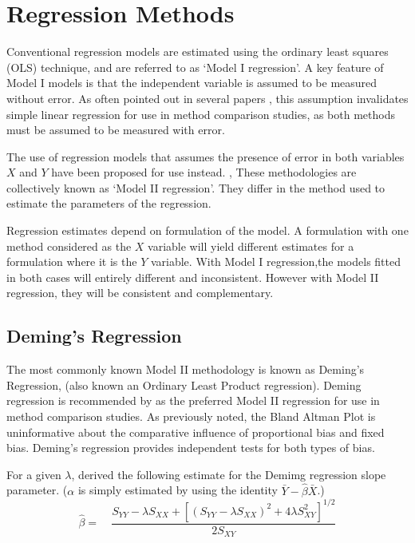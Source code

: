 \documentclass[MAIN.tex]{subfiles}
\begin{document}
	
		\section{Regression Methods}
	Conventional regression models are estimated using the ordinary
	least squares (OLS) technique, and are referred to as `Model I
	regression'\citep{CornCoch,ludbrook97}. A key feature of Model I
	models is that the independent variable is assumed to be measured
	without error. As often pointed out in several papers
	\citep{BA83,ludbrook97}, this assumption invalidates simple linear
	regression for use in method comparison studies, as both methods
	must be assumed to be measured with error.
	
	The use of regression models that assumes the presence of error in
	both variables $X$ and $Y$ have been proposed for use instead.
	\citep{CornCoch,ludbrook97}, These methodologies are collectively
	known as `Model II regression'. They differ in the method used to
	estimate the parameters of the regression.
	
	Regression estimates depend on formulation of the model. A
	formulation with one method considered as the $X$ variable will
	yield different estimates for a formulation where it is the $Y$
	variable. With Model I regression,the models fitted in both cases
	will entirely different and inconsistent. However with Model II
	regression, they will be consistent and complementary.
	
	\subsection{Deming's Regression}
	The most commonly known Model II methodology is known as Deming's
	Regression, (also known an Ordinary Least Product regression).
	Deming regression is recommended by \citet*{CornCoch} as the
	preferred Model II regression for use in method comparison
	studies. As previously noted, the Bland Altman Plot is
	uninformative about the comparative influence of proportional bias
	and fixed bias. Deming's regression provides independent tests for
	both types of bias.
	
	For a given $\lambda$, \citet{Kummel} derived the following
	estimate for the Demimg regression slope parameter. ($\alpha$ is
	simply estimated by using the identity
	$\bar{Y}-\hat{\beta}\bar{X}$.)
	\begin{equation}
	\hat{\beta} =\quad \frac{S_{YY} - \lambda S_{XX}+[(S_{YY} -
		\lambda S_{XX})^{2}+ 4\lambda S^{2}_{XY}]^{1/2}}{2S_{XY}}
	\end{equation}
	
\end{document}
